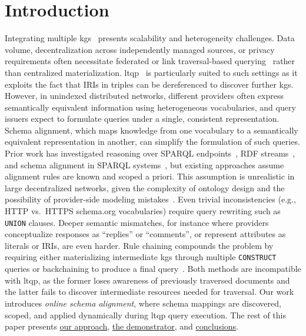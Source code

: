 \section{Introduction}

Integrating multiple \glspl{kg}~\cite{linked_data} presents scalability and heterogeneity challenges.
Data volume, decentralization across independently managed sources, or privacy requirements often necessitate federated or link traversal-based querying~\cite{Hartig2012} rather than centralized materialization.
\Gls{ltqp}~\cite{Hartig2012} is particularly suited to such settings as it exploits the fact that IRIs in triples can be dereferenced to discover further \glspl{kg}.
However, in unindexed distributed networks, different providers often express semantically equivalent information using heterogeneous vocabularies, and query issuers expect to formulate queries under a single, consistent representation.
Schema alignment, which maps knowledge from one vocabulary to a semantically equivalent representation in another, can simplify the formulation of such queries.
Prior work has investigated reasoning over SPARQL endpoints~\cite{terdjimi2016hylar}, RDF streams~\cite{bonte2025languages}, and schema alignment in SPARQL systems~\cite{cheng2023considering, Joshi2012, maarten2023pod}, but existing approaches assume alignment rules are known and scoped a priori.
This assumption is unrealistic in large decentralized networks, given the complexity of ontology design and the possibility of provider-side modeling mistakes~\cite{abedjan2012reconciling, lorey2011rdf}.
Even trivial inconsistencies (e.g., HTTP vs.\ HTTPS schema.org vocabularies) require query rewriting such as \texttt{UNION} clauses.
Deeper semantic mismatches, for instance where providers conceptualize responses as ``replies'' or ``comments'', or represent attributes as literals or IRIs, are even harder.
Rule chaining compounds the problem by requiring either materializing intermediate \glspl{kg} through multiple \texttt{CONSTRUCT} queries or backchaining to produce a final query~\cite{maarten2023pod}.
Both methods are incompatible with \gls{ltqp}, as the former loses awareness of previously traversed documents and the latter fails to discover intermediate resources needed for traversal.
Our work introduces \textit{online schema alignment}, where schema mappings are discovered, scoped, and applied dynamically during \gls{ltqp} query execution.
The rest of this paper presents \hyperref[sec:method]{our approach}, \hyperref[sec:demo]{the demonstrator}, and \hyperref[sec:conclusion]{conclusions}.
